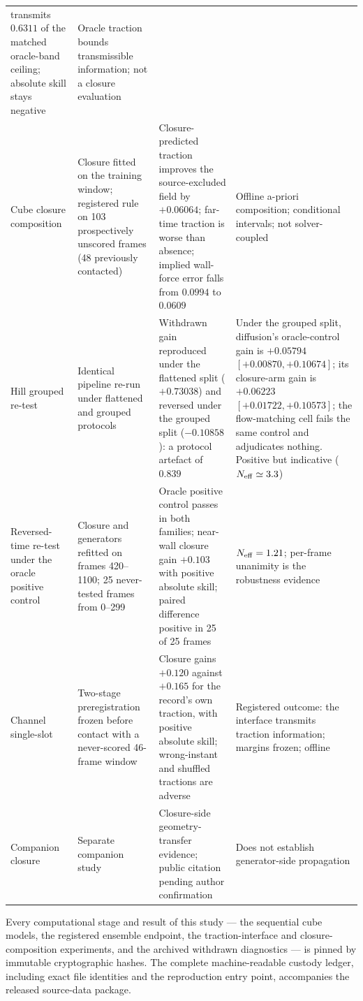 \documentclass[11pt]{article}
\begin{document}
{\begin{longtable}{@{}P{1.9cm}P{3.1cm}P{4.4cm}P{4.9cm}@{}}
transmits $0.6311$ of the matched oracle-band ceiling; absolute skill stays negative &
Oracle traction bounds transmissible information; not a closure evaluation \\
Cube closure composition &
Closure fitted on the training window; registered rule on 103 prospectively unscored frames
(48 previously contacted) &
Closure-predicted traction improves the source-excluded field by $+0.06064$; far-time traction
is worse than absence; implied wall-force error falls from $0.0994$ to $0.0609$ &
Offline a-priori composition; conditional intervals; not solver-coupled \\
Hill grouped re-test &
Identical pipeline re-run under flattened and grouped protocols &
Withdrawn gain reproduced under the flattened split ($+0.73038$) and reversed under the grouped
split ($-0.10858$): a protocol artefact of $0.839$ &
Under the grouped split, diffusion's oracle-control gain is $+0.05794$\newline
$[+0.00870,+0.10674]$; its closure-arm gain is $+0.06223$\newline
$[+0.01722,+0.10573]$;
the flow-matching cell fails the same control and adjudicates nothing. Positive but indicative
($N_{\rm eff}\simeq3.3$) \\
Reversed-time re-test under the oracle positive control &
Closure and generators refitted on frames 420--1100; 25 never-tested frames from 0--299 &
Oracle positive control passes in both families; near-wall closure gain $+0.103$ with positive absolute
skill; paired difference positive in 25 of 25 frames &
$N_{\rm eff}=1.21$; per-frame unanimity is the robustness evidence \\
Channel single-slot &
Two-stage preregistration frozen before contact with a never-scored 46-frame window &
Closure gains $+0.120$ against $+0.165$ for the record's own traction, with positive absolute
skill; wrong-instant and shuffled tractions are adverse &
Registered outcome: the interface transmits traction information; margins frozen; offline \\
Companion closure &
Separate companion study &
Closure-side geometry-transfer evidence; public citation pending author confirmation &
Does not establish generator-side propagation \\
\end{longtable}}

Every computational stage and result of this study --- the sequential cube models, the registered
ensemble endpoint, the traction-interface and closure-composition experiments, and the archived
withdrawn diagnostics --- is pinned by immutable cryptographic hashes. The complete
machine-readable custody ledger, including exact file identities and the reproduction entry
point, accompanies the released source-data package.
\end{document}
